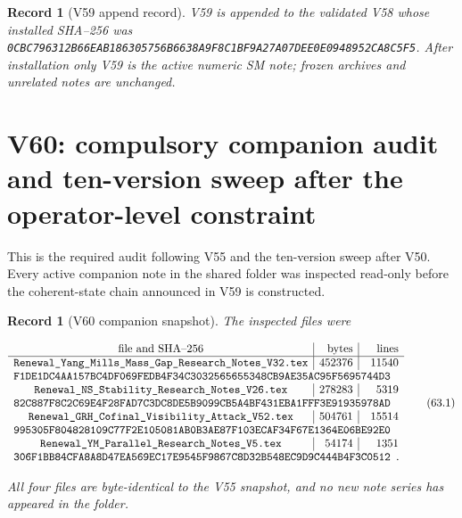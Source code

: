 \documentclass[11pt]{article}
\newtheorem{record}[theorem]{Record}
\theoremstyle{remark}
\begin{document}
\begin{record}[V59 append record]
\label{rec:v19v59}
V59 is appended to the validated V58 whose installed SHA--256 was
\texttt{0CBC796312B66EAB186305756B6638A9F8C1BF9A27A07DEE0E0948952CA8C5F5}.
After installation only V59 is the active numeric SM note; frozen
archives and unrelated notes are unchanged.
\end{record}


\section{V60: compulsory companion audit and ten-version sweep after the operator-level constraint}
\label{sec:v19v60}

This is the required audit following V55 and the ten-version sweep
after V50.  Every active companion note in the shared folder was
inspected read-only before the coherent-state chain announced in V59
is constructed.

\begin{record}[V60 companion snapshot]
\label{rec:v19v60-snapshot}
The inspected files were

\[
\begin{array}{c|r|r}
\hbox{file and SHA--256}&\hbox{bytes}&\hbox{lines}\\ \hline
\texttt{Renewal\_Yang\_Mills\_Mass\_Gap\_Research\_Notes\_V32.tex}
&452376&11540\\
\multicolumn{3}{l}{
\texttt{F1DE1DC4AA157BC4DF069FEDB4F34C3032565655348CB9AE35AC95F5695744D3}}
\\
\texttt{Renewal\_NS\_Stability\_Research\_Notes\_V26.tex}
&278283&5319\\
\multicolumn{3}{l}{
\texttt{82C887F8C2C69E4F28FAD7C3DC8DE5B9099CB5A4BF431EBA1FFF3E91935978AD}}
\\
\texttt{Renewal\_GRH\_Cofinal\_Visibility\_Attack\_V52.tex}
&504761&15514\\
\multicolumn{3}{l}{
\texttt{995305F804828109C77F2E105081AB0B3AE87F103ECAF34F67E1364E06BE92E0}}
\\
\texttt{Renewal\_YM\_Parallel\_Research\_Notes\_V5.tex}
&54174&1351\\
\multicolumn{3}{l}{
\texttt{306F1BB84CFA8A8D47EA569EC17E9545F9867C8D32B548EC9D9C444B4F3C0512}}.
\end{array}                                                     \tag{63.1}
\]

All four files are byte-identical to the V55 snapshot, and no new
note series has appeared in the folder.
\end{record}
\end{document}
